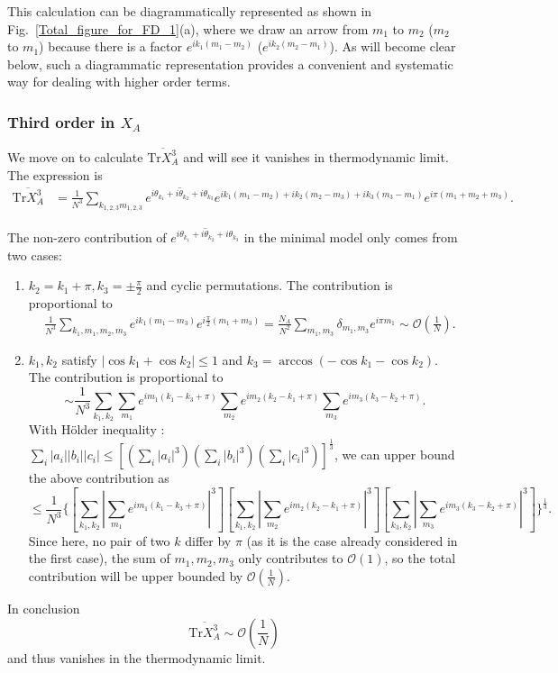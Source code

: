 \documentclass[aps,onecolumn,nofootinbib,superscriptaddress,notitlepage,longbibliography]{revtex4-1}
\def \Tr {\mathrm{Tr}}
\begin{document}
This calculation can be diagrammatically represented as shown in Fig.~\ref{Total_figure_for_FD_1}(a), where we draw an arrow from $m_1$ to $m_2$ ($m_2$ to $m_1$) because there is a factor $e^{ik_1(m_1-m_2)}$ ($e^{ik_2(m_2-m_1)}$). As will become clear below, such a diagrammatic representation provides a convenient and systematic way for dealing with higher order terms.

\subsubsection{Third order in $X_{A}$}
We move on to calculate $\overline{\Tr X_{A}^{3}}$ and will %
see %
it vanishes in thermodynamic limit. The expression is 
\begin{align*}
\overline{\Tr X_{A}^{3}} & =\frac{1}{N^{3}}\sum_{k_{1,2,3}m_{1,2,3}}\overline{e^{i\theta_{k_{1}}+i\theta_{k_{2}}+i\theta_{k_{3}}}}e^{ik_{1}(m_{1}-m_{2})+ik_{2}(m_{2}-m_{3})+ik_{3}(m_{3}-m_{1})}e^{i\pi(m_{1}+m_{2}+m_{3})}.
\end{align*}

The non-zero contribution of $\overline{e^{i\theta_{k_{1}}+i\theta_{k_{2}}+i\theta_{k_{3}}}}$
in the minimal model only comes from two cases:
\begin{enumerate}
\item $k_{2}=k_{1}+\pi,k_{3}=\pm\frac{\pi}{2}$ and cyclic permutations.
The contribution is proportional to 
\begin{align*}
 & \frac{1}{N^{3}}\sum_{k_{1},m_{1},m_{2},m_{3}}e^{ik_{1}(m_{1}-m_{3})}e^{i\frac{\pi}{2}(m_{1}+m_{3})} =\frac{N_{A}}{N^{2}}\sum_{m_{1},m_{3}}\delta_{m_{1},m_{3}}e^{i\pi m_{1}}\sim \mathcal{O}\left(\frac{1}{N}\right).
\end{align*}
\item $k_{1},k_{2}$ satisfy $|\cos k_{1}+\cos k_{2}|\leq1$ and $k_{3}=\arccos(-\cos k_{1}-\cos k_{2})$.
The contribution is proportional to
\[
\sim\frac{1}{N^{3}}\sum_{k_{1},k_{2}}\sum_{m_{1}}e^{im_{1}(k_{1}-k_{3}+\pi)}\sum_{m_{2}}e^{im_{2}(k_{2}-k_{1}+\pi)}\sum_{m_{3}}e^{im_{3}(k_{3}-k_{2}+\pi)}.
\]
With H\"older inequality \citep{hardy1988inequalities}: $\sum_{i}|a_{i}||b_{i}||c_{i}|\leq[(\sum_{i}|a_{i}|^{3})(\sum_{i}|b_{i}|^{3})(\sum_{i}|c_{i}|^{3})]^{\frac{1}{3}}$,
we can upper bound the above contribution as 
\[
\leq\frac{1}{N^{3}}\{[\sum_{k_{1},k_{2}}|\sum_{m_{1}}e^{im_{1}(k_{1}-k_{3}+\pi)}|^{3}][\sum_{k_{1},k_{2}}|\sum_{m_{2}}e^{im_{2}(k_{2}-k_{1}+\pi)}|^{3}][\sum_{k_{3},k_{2}}|\sum_{m_{3}}e^{im_{3}(k_{3}-k_{2}+\pi)}|^{3}]\}^{\frac{1}{3}}.
\]
Since here, no pair of two $k$ differ by $\pi$ (as it is the case
already considered in the first case), the sum of $m_{1},m_{2},m_{3}$
only contributes to $\mathcal{O}(1)$, so the total contribution will be upper
bounded by $\mathcal{O}\left(\frac{1}{N}\right)$.
\end{enumerate}
In conclusion
\[
\overline{\Tr X_{A}^{3}}\sim \mathcal{O}\left(\frac{1}{N}\right)
\]
and thus vanishes in the thermodynamic limit. 
\end{document}
